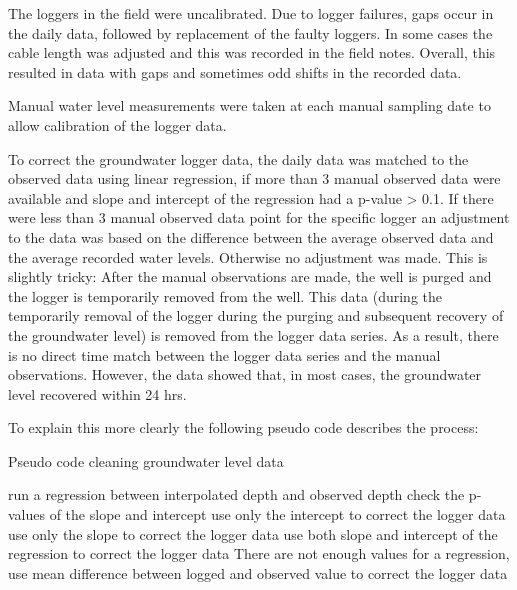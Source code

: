 \documentclass[, manuscript]{copernicus}
\begin{document}
The loggers in the field were uncalibrated. Due to logger failures, gaps
occur in the daily data, followed by replacement of the faulty loggers.
In some cases the cable length was adjusted and this was recorded in the
field notes. Overall, this resulted in data with gaps and sometimes odd
shifts in the recorded data.

Manual water level measurements were taken at each manual sampling date
to allow calibration of the logger data.

To correct the groundwater logger data, the daily data was matched to
the observed data using linear regression, if more than 3 manual
observed data were available and slope and intercept of the regression
had a p-value \textgreater{} 0.1. If there were less than 3 manual
observed data point for the specific logger an adjustment to the data
was based on the difference between the average observed data and the
average recorded water levels. Otherwise no adjustment was made. This is
slightly tricky: After the manual observations are made, the well is
purged and the logger is temporarily removed from the well. This data
(during the temporarily removal of the logger during the purging and
subsequent recovery of the groundwater level) is removed from the logger
data series. As a result, there is no direct time match between the
logger data series and the manual observations. However, the data showed
that, in most cases, the groundwater level recovered within 24 hrs.

To explain this more clearly the following pseudo code describes the
process:

\begin{algorithm}
\caption{Pseudo code cleaning groundwater level data}
\label{a1}
\begin{algorithmic}
        \STATE run a regression between interpolated depth and observed depth  
        \STATE check the p-values of the slope and intercept
                \STATE  use only the intercept to correct the logger data
        \ELSE
                        \STATE use only the slope to correct the logger data
                \ELSE
                       \STATE use both slope and intercept of the regression to correct the logger data
                \ENDIF
        \ENDIF
\ELSE
        \STATE There are not enough values for a regression, use mean difference between logged and observed value to correct the logger data
\ENDIF
\end{algorithmic}
\end{algorithm}
\end{document}
